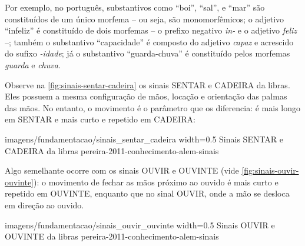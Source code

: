 Por exemplo, no português, substantivos como ``boi'', ``sal'', e ``mar'' são constituídos de um único morfema -- ou seja,  são monomorfêmicos; o adjetivo ``infeliz'' é constituído de dois morfemas -- o prefixo negativo \textit{in-} e o adjetivo \textit{feliz} --; também o substantivo ``capacidade'' é composto do adjetivo \textit{capaz} e acrescido do sufixo \textit{-idade}; já o substantivo ``guarda-chuva'' é constituído pelos morfemas \textit{guarda} e \textit{chuva}.


Observe na \autoref{fig:sinais-sentar-cadeira} os sinais SENTAR e CADEIRA da \acrshort{libras}. Eles possuem a mesma configuração de mãos, locação e orientação das palmas das mãos. No entanto, o movimento é o parâmetro que os diferencia: é mais longo em SENTAR e mais curto e repetido em CADEIRA: 


    {imagens/fundamentacao/sinais_sentar_cadeira} %
    {width=0.5\linewidth} %
    {Sinais SENTAR e CADEIRA da \acrshort{libras}} %
    {pereira-2011-conhecimento-alem-sinais} %


Algo semelhante ocorre com os sinais OUVIR e OUVINTE (vide \autoref{fig:sinais-ouvir-ouvinte}): o movimento de fechar as mãos próximo ao ouvido é mais curto e repetido em OUVINTE, enquanto que no sinal OUVIR, onde a mão se desloca em direção ao ouvido.

    {imagens/fundamentacao/sinais_ouvir_ouvinte} %
    {width=0.5\linewidth} %
    {Sinais OUVIR e OUVINTE da \acrshort{libras}} %
    {pereira-2011-conhecimento-alem-sinais} %




